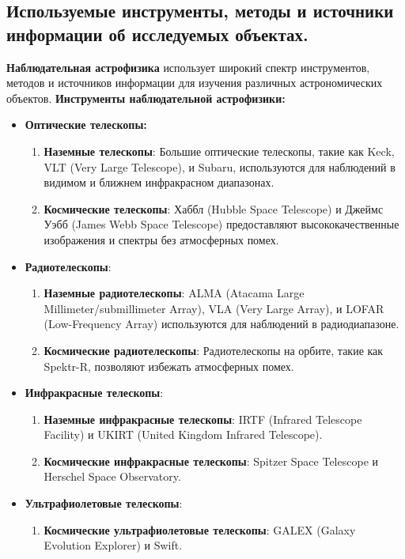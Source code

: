 \documentclass[12pt]{article}
\begin{document}
	\subsection{Используемые инструменты, методы и источники информации об исследуемых объектах.} 
	\textbf{Наблюдательная астрофизика} использует широкий спектр инструментов, методов и источников информации для изучения различных астрономических объектов.
	\textbf{Инструменты наблюдательной астрофизики:}
	\begin{itemize}
		\item \textbf{Оптические телескопы:}
				\begin{enumerate}
				\item 	\textbf{Наземные телескопы}: Большие оптические телескопы, такие как Keck, VLT (Very Large Telescope), и Subaru, используются для наблюдений в видимом и ближнем инфракрасном диапазонах.
				\item \textbf{Космические телескопы}: Хаббл (Hubble Space Telescope) и Джеймс Уэбб (James Webb Space Telescope) предоставляют высококачественные изображения и спектры без атмосферных помех.
			\end{enumerate}
		\item\textbf{Радиотелескопы}:	
				\begin{enumerate}
				\item 	\textbf{Наземные радиотелескопы}: ALMA (Atacama Large Millimeter/submillimeter Array), VLA (Very Large Array), и LOFAR (Low-Frequency Array) используются для наблюдений в радиодиапазоне.
				\item \textbf{Космические радиотелескопы}: Радиотелескопы на орбите, такие как Spektr-R, позволяют избежать атмосферных помех.
			\end{enumerate}
			
			\item\textbf{Инфракрасные телескопы}:	
		\begin{enumerate}
			\item 	\textbf{Наземные инфракрасные телескопы}: IRTF (Infrared Telescope Facility) и UKIRT (United Kingdom Infrared Telescope).
			\item \textbf{Космические инфракрасные телескопы}: Spitzer Space Telescope и Herschel Space Observatory.
		\end{enumerate}	
		
		
			\item\textbf{Ультрафиолетовые телескопы}:	
				\begin{enumerate}
				\item 	\textbf{Космические ультрафиолетовые телескопы}: GALEX (Galaxy Evolution Explorer) и Swift.
			\end{enumerate}	
			

\end{itemize}
\end{document}
